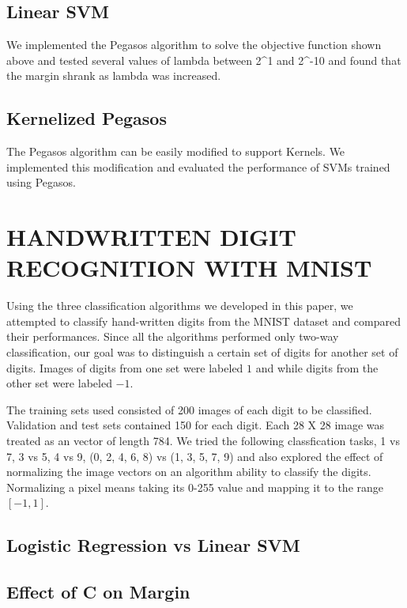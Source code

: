 \documentclass[10pt,twoside]{article}
\begin{document}
\subsection{Linear SVM}
We implemented the Pegasos algorithm to solve the objective function shown above and tested several values of lambda between 2^1 and 2^-10 and found that the margin shrank as lambda was increased. 


\subsection{Kernelized Pegasos}
The Pegasos algorithm can be easily modified to support Kernels. We implemented this modification and evaluated the performance of SVMs trained using Pegasos. 



\section{\uppercase{Handwritten Digit Recognition with MNIST}}
Using the three classification algorithms we developed in this paper, we attempted to classify hand-written digits from the MNIST dataset and compared their performances. Since all the algorithms performed only two-way classification, our goal was to distinguish a certain set of digits for another set of digits. Images of digits from one set were labeled $1$ and while digits from the other set were labeled $-1$.

The training sets used consisted of 200 images of each digit to be classified. Validation and test sets contained 150 for each digit. Each 28 X 28 image was treated as an vector of length 784. We tried the following classfication tasks,  1 vs 7, 3 vs 5, 4 vs 9, (0, 2, 4, 6, 8) vs (1, 3, 5, 7, 9) and also explored the effect of normalizing the image vectors on an algorithm ability to classify the digits. Normalizing a pixel means taking its 0-255 value and mapping it to the range $[-1,1]$. 

\subsection{Logistic Regression vs Linear SVM}

\subsection{Effect of C on Margin}

\vfill
\end{document}
